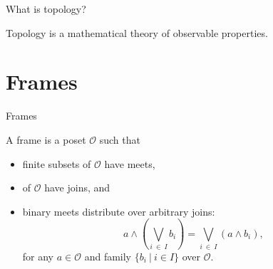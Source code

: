\documentclass[xcolor={dvipsnames}]{beamer}
\begin{document}
\begin{frame}{What is topology?}
  \huge
  \begin{center}
    Topology is a mathematical theory of \alert{observable} properties.
  \end{center}
\end{frame}

\section{Frames}

\begin{frame}{Frames}
  \large
  \vspace{1.5em}

  A \alert{frame} is a poset $\mathcal{O}$ such that
  \begin{itemize}
    \item \alert{finite subsets} of $\mathcal{O}$ have \alert{meets},
    \item {} of $\mathcal{O}$ have \alert{joins},
      and
    \item binary meets distribute over arbitrary joins:
      \begin{equation*}
        a \wedge \left( \bigvee_{i~\in~I} b_i \right) = \bigvee_{i~\in~I} \left( a \wedge b_i \right),
      \end{equation*}
      for any $a \in \mathcal{O}$ and family $\{ b_i ~|~ i \in I \}$ over $\mathcal{O}$.
  \end{itemize}

  \vspace{1em}

\end{frame}
\end{document}
